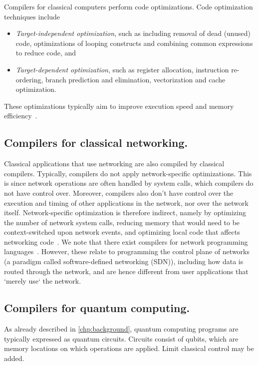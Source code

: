 Compilers for classical computers perform code optimizations.
Code optimization techniques include
\begin{itemize}
  \item \emph{Target-independent optimization}, such as including removal of dead (unused) code, optimizations of looping constructs and combining common expressions to reduce code, and
  \item \emph{Target-dependent optimization}, such as register allocation, instruction re-ordering, branch prediction and elimination, vectorization and cache optimization.
\end{itemize}
These optimizations typically aim to improve execution speed and memory efficiency~\cite{aho_compilers_2006}.

\subsection{Compilers for classical networking.}
Classical applications that use networking are also compiled by classical compilers.
Typically, compilers do not apply network-specific optimizations.
This is since network operations are often handled by system calls, which compilers do not have control over.
Moreover, compilers also don't have control over the execution and timing of other applications in the network, nor over the network itself.
Network-specific optimization is therefore indirect, namely by optimizing the number of network system calls, reducing memory that would need to be context-switched upon network events, and optimizing local code that affects networking code~\cite{danalis_mpi-aware_2009}.
We note that there exist compilers for network programming languages~\cite{monsanto_compiler_2012, li_modular_2020}.
However, these relate to programming the control plane of networks (a paradigm called software-defined networking (SDN)), including how data is routed through the network, and are hence different from user applications that `merely use` the network.


\subsection{Compilers for quantum computing.}
\label{compiler:sec:compilers-qc}
As already described in \cref{chp:background}, quantum computing programs are typically expressed as quantum circuits.
Circuits consist of qubits, which are memory locations on which operations are applied.
Limit classical control may be added.

